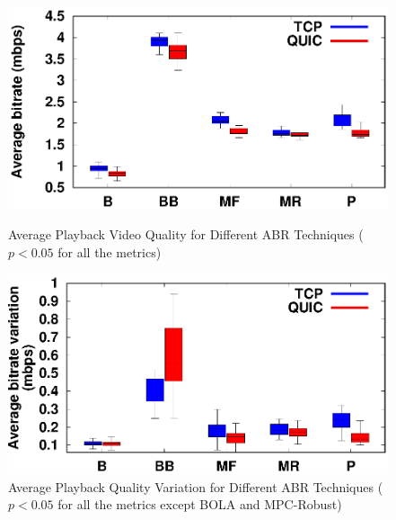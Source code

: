 \begin{figure}[!t]
	\begin{minipage}[t]{0.48\linewidth}
		\includegraphics[width=\linewidth]{img/newexp/bitrate_box}
		\caption{\label{fig:chap03s2:averageQuality_n}Average Playback Video Quality for Different ABR Techniques ($p<0.05$ for all the metrics)}
	\end{minipage}\hfill
	\begin{minipage}[t]{0.48\linewidth}
		\includegraphics[width=\linewidth]{img/newexp/smooth_box}
		\caption{\label{fig:chap03s2:averageQualityVariation_n}Average Playback Quality Variation for Different ABR Techniques ($p<0.05$ for all the metrics except BOLA and MPC-Robust)}
	\end{minipage}


\end{figure}
